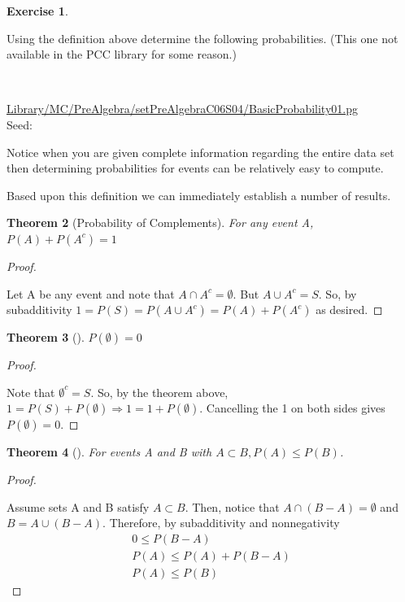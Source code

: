 \documentclass[10pt,]{book}
\theoremstyle{plain}
\newtheorem{theorem}{Theorem}[section]
\theoremstyle{definition}
\theoremstyle{definition}
\theoremstyle{definition}
\newtheorem{exercise}[theorem]{Exercise}
\numberwithin{equation}{section}
\begin{document}
\begin{exercise}\label{exercise-6}

		Using the definition above determine the following probabilities.  (This one not available
		in the PCC library for some reason.)
\par\medskip
\mbox{}\\ %
\begin{mdframed}
{}\par\vspace*{2ex}%
{\tiny\ttfamily\noindent\url{Library/MC/PreAlgebra/setPreAlgebraC06S04/BasicProbability01.pg}\\Seed: \hfill}\end{mdframed}
\medskip\noindent 
		Notice when you are given complete information regarding the entire data set then determining
		probabilities for events can be relatively easy to compute.
\par
\end{exercise}
\par
Based upon this definition we can immediately establish a number of results.%
\begin{theorem}[{Probability of Complements}]\label{ProbabilityComplemnts}
 For any event A, \(P(A) + P(A^c) = 1\)\end{theorem}
\begin{proof}\hypertarget{proof-10}{}
Let A be any event and note that \(A \cap A^c = \emptyset\).  But \(A \cup A^c = S\).
			So, by subadditivity \(1 = P(S) = P(A \cup A^c) = P(A) + P(A^c)\) as desired.%
\end{proof}
\begin{theorem}[{}]\label{ProbabilityEmptySet}
\(P(\emptyset) = 0\)\end{theorem}
\begin{proof}\hypertarget{proof-11}{}
Note that \(\emptyset^c = S\). So, by the theorem above, 
			\(1 = P(S) + P(\emptyset) \Rightarrow 1 = 1 + P(\emptyset)\).
			Cancelling the 1 on both sides gives \(P(\emptyset) = 0\). %
\end{proof}
\begin{theorem}[{}]\label{ProbabilityContainment}
For events A and B with \( A \subset B, P(A) \le P(B)\).
		\end{theorem}
\begin{proof}\hypertarget{proof-12}{}
Assume sets A and B satisfy \( A \subset B\). Then, notice that
			\(A \cap (B-A) = \emptyset\) and  \(B = A \cup (B-A)\). Therefore, by 
			subadditivity and nonnegativity%
\begin{gather*}
0 \le P(B-A)\\
P(A) \le P(A) + P(B-A) \\
P(A) \le P(B)
\end{gather*}\end{proof}
\end{document}
